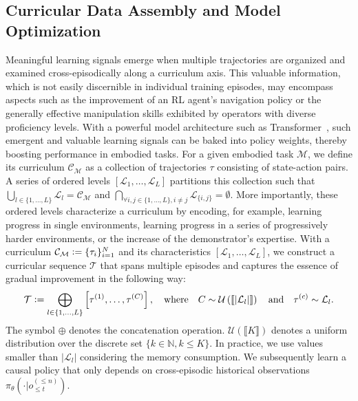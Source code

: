 \documentclass{article}
\begin{document}
\subsection{Curricular Data Assembly and Model Optimization}
Meaningful learning signals emerge when multiple trajectories are organized and examined cross-episodically along a curriculum axis.
This valuable information, which is not easily discernible in individual training episodes, may encompass aspects such as the improvement of an RL agent's navigation policy or the generally effective manipulation skills exhibited by operators with diverse proficiency levels.
With a powerful model architecture such as Transformer~\cite {vaswani2017attention,dai2019transformerxl}, such emergent and valuable learning signals can be baked into policy weights, thereby boosting performance in embodied tasks.
For a given embodied task $\mathcal{M}$, we define its curriculum $\mathcal{C}_\mathcal{M}$ as a collection of trajectories $\tau$ consisting of state-action pairs.
A series of ordered levels $[\mathcal{L}_1, \ldots, \mathcal{L}_L]$ partitions this collection such that $\bigcup_{l \in \{1, \ldots, L\}} \mathcal{L}_{l} = \mathcal{C}_\mathcal{M}$ and $\bigcap_{\forall i, j \in \{1, \ldots, L\}, i \neq j} \mathcal{L}_{\{i, j\}} = \emptyset$.
More importantly, these ordered levels characterize a curriculum by encoding, for example, learning progress in single environments, learning progress in a series of progressively harder environments, or the increase of the demonstrator's expertise.
With a curriculum $\mathcal{C}_\mathcal{M} \vcentcolon= \{\tau_i\}_{i = 1}^N$ and its characteristics $[\mathcal{L}_1, \ldots, \mathcal{L}_L]$, we construct a curricular sequence $\mathcal{T}$ that spans multiple episodes and captures the essence of gradual improvement in the following way:
\begin{equation}
    \mathcal{T} \vcentcolon= \bigoplus_{l \in \{1, \ldots, L\}} \left[\tau^{(1)}, \ldots, \tau^{(C)} \right], \quad  \text{where} \quad C \sim  \mathcal{U}\left(\llbracket \vert \mathcal{L}_l \vert \rrbracket\right) \quad \text{and} \quad \tau^{(c)} \sim \mathcal{L}_l.
\end{equation}
The symbol $\oplus$ denotes the concatenation operation. $\mathcal{U}\left( \llbracket K \rrbracket \right)$ denotes a uniform distribution over the discrete set $\{k \in \mathbb{N}, k\leq K \}$. In practice, we use values smaller than $\vert \mathcal{L}_l \vert$ considering the memory consumption.
We subsequently learn a causal policy that only depends on cross-episodic historical observations $\pi_\theta (\cdot \vert o_{\leq t}^{(\leq n)})$.
\end{document}
